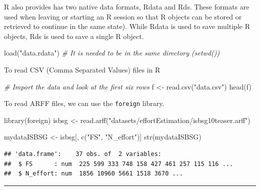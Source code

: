 \documentclass[
]{book}
\newenvironment{Shaded}{\begin{snugshade}}{\end{snugshade}}
\newcommand{\CommentTok}[1]{\textcolor[rgb]{0.56,0.35,0.01}{\textit{#1}}}
\newcommand{\FunctionTok}[1]{\textcolor[rgb]{0.00,0.00,0.00}{#1}}
\newcommand{\NormalTok}[1]{#1}
\newcommand{\OtherTok}[1]{\textcolor[rgb]{0.56,0.35,0.01}{#1}}
\newcommand{\StringTok}[1]{\textcolor[rgb]{0.31,0.60,0.02}{#1}}
\begin{document}
R also provides has two native data formats, Rdata and Rds. These formats are used when leaving or starting an R session so that R objects can be stored or retrieved to continue in the same state). While Rdata is used to save multiple R objects, Rds is used to save a single R object.

\begin{Shaded}
\begin{Highlighting}[]
\FunctionTok{load}\NormalTok{(}\StringTok{"data.rdata"}\NormalTok{) }\CommentTok{\# It is needed to be in the same directory (setwd())}
\end{Highlighting}
\end{Shaded}

To read CSV (Comma Separated Values) files in R

\begin{Shaded}
\begin{Highlighting}[]
\CommentTok{\# Import the data and look at the first six rows}
\NormalTok{f }\OtherTok{\textless{}{-}} \FunctionTok{read.csv}\NormalTok{(}\StringTok{"data.csv"}\NormalTok{)}
\FunctionTok{head}\NormalTok{(f)}
\end{Highlighting}
\end{Shaded}

To read ARFF files, we can use the \texttt{foreign} library.

\begin{Shaded}
\begin{Highlighting}[]
\FunctionTok{library}\NormalTok{(foreign)}
\NormalTok{isbsg }\OtherTok{\textless{}{-}} \FunctionTok{read.arff}\NormalTok{(}\StringTok{"datasets/effortEstimation/isbsg10teaser.arff"}\NormalTok{)}

\NormalTok{mydataISBSG }\OtherTok{\textless{}{-}}\NormalTok{ isbsg[, }\FunctionTok{c}\NormalTok{(}\StringTok{"FS"}\NormalTok{, }\StringTok{"N\_effort"}\NormalTok{)]}
\FunctionTok{str}\NormalTok{(mydataISBSG)}
\end{Highlighting}
\end{Shaded}

\begin{verbatim}
## 'data.frame':    37 obs. of  2 variables:
##  $ FS      : num  225 599 333 748 158 427 461 257 115 116 ...
##  $ N_effort: num  1856 10960 5661 1518 3670 ...
\end{verbatim}

\begin{center}\rule{0.5\linewidth}{0.5pt}\end{center}
\end{document}
